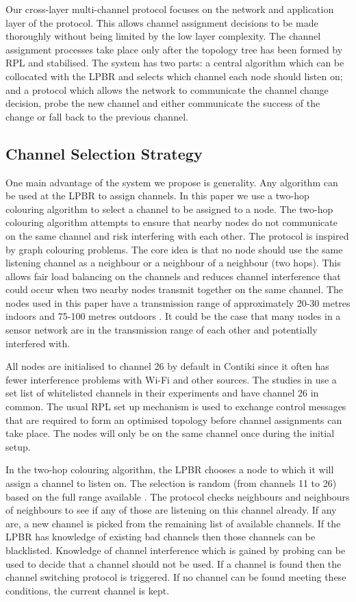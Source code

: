 Our cross-layer multi-channel protocol focuses on the network and application layer of the protocol. This allows channel assignment decisions to be made thoroughly without being limited by the low layer complexity. The channel assignment processes take place only after the topology tree has been formed by RPL and stabilised. The system has two parts: a central algorithm which can be collocated with the LPBR and selects which channel each node should listen on; and a protocol which allows the network to communicate the channel change decision, probe the new channel and either communicate the success of the change or fall back to the previous channel. 

\subsection{Channel Selection Strategy}

One main advantage of the system we propose is generality. Any algorithm can be used at the LPBR to assign channels. In this paper we use a two-hop colouring algorithm to select a channel to be assigned to a node.
The two-hop colouring algorithm attempts to ensure that nearby nodes do not communicate on the same channel and risk interfering with each other. The protocol is inspired by graph colouring problems. The core idea is that no node should use the same listening channel as a neighbour or a neighbour of a neighbour (two hops).
This allows fair load balancing on the channels and reduces channel interference that could occur when two nearby nodes transmit together on the same channel. The nodes used in this paper have a transmission range of approximately 20-30 metres indoors and 75-100 metres outdoors \cite{telosb-datasheet}. It could be the case that many nodes in a sensor network are in the transmission range of each other and potentially interfered with.
 
All nodes are initialised to channel 26 by default in Contiki since it often has fewer interference problems with Wi-Fi and other sources. The studies in \cite{chrysso, micmac, watteyne} use a set list of whitelisted channels in their experiments and have channel 26 in common. The usual RPL set up mechanism is used to exchange control messages that are required to form an optimised topology before channel assignments can take place. The nodes will only be on the same channel once during the initial setup.  
	
In the two-hop colouring algorithm, the LPBR chooses a node to which it will assign a channel to listen on. The selection is random (from channels 11 to 26) based on the full range available \cite{ieee802.15.4}. The protocol checks neighbours and neighbours of neighbours to see if any of those are listening on this channel already. If any are, a new channel is picked from the remaining list of available channels. If the LPBR has knowledge of existing bad channels then those channels can be blacklisted.  Knowledge of channel interference which is gained by probing can be used to decide that a channel should not be used. If a channel is found then the channel switching protocol is triggered. If no channel can be found meeting these conditions, the current channel is kept.  


